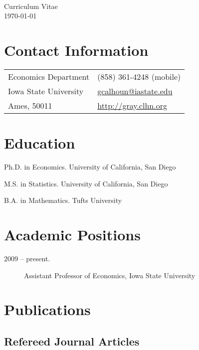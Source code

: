 \documentclass[12pt]{article}%
\newcommand{\allcaps}[1]{\textls{\MakeUppercase{#1}}}
\begin{document}
\begin{center}
  \allcaps{\textbf{\large Gray Calhoun}}              \\
  Curriculum Vitae                                    \\
  \today
\end{center}
\section*{Contact Information}
\begin{tabular}{@{}ll@{}}
Economics Department     & (858) 361-4248 (mobile)    \\
Iowa State University    & \url{gcalhoun@iastate.edu} \\
Ames, \allcaps{IA} 50011 & \url{http://gray.clhn.org}
\end{tabular}

\section*{Education}

\begin{description}[noitemsep]
\item[2009.] Ph.D. in Economics. University of California, San Diego
\item[2006.] M.S. in Statistics. University of California, San Diego
\item[2001.] B.A. in Mathematics. Tufts University
\end{description}

\section*{Academic Positions}

\begin{description}
\item[2009 -- present.] Assistant Professor of Economics, Iowa State University
\end{description}

\section*{Publications}

\subsection*{Refereed Journal Articles}
\end{document}
